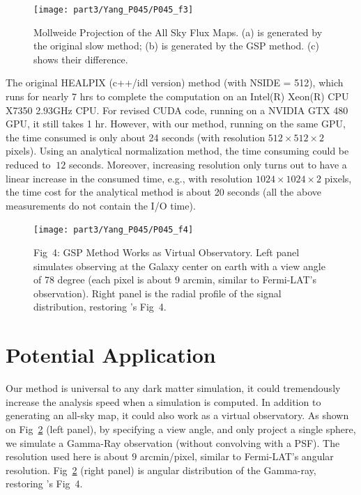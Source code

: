 \begin{figure}[htb]
\begin{center}
 \texttt{[image: part3/Yang\_P045/P045\_f3]}
\caption{Mollweide Projection of the All Sky Flux Maps. (a) is generated by the original slow method; (b) is generated by the GSP method. (c) shows their difference. \label{figcmp}}
\end{center}
\end{figure}

The original HEALPIX (c++/idl version) method (with NSIDE = 512), which runs for nearly 7 hrs to complete the computation on an Intel(R) Xeon(R) CPU X7350 2.93GHz CPU. For revised CUDA code, running on a NVIDIA GTX 480 GPU, it still takes 1 hr. However, with our method, running on the same GPU, the time consumed is only about 24 seconds (with resolution $512\times512\times2$ pixels). Using an analytical normalization method, the time consuming could be reduced to $~12$ seconds. Moreover, increasing resolution only turns out to have a linear increase in the consumed time, e.g., with resolution $1024\times1024\times2$ pixels, the time cost for the analytical method is about 20 seconds (all the above measurements do not contain the I/O time). 

\begin{figure}[htb]
\begin{center}
 \texttt{[image: part3/Yang\_P045/P045\_f4]}
\caption{Fig~4: GSP Method Works as Virtual Observatory. Left panel simulates observing at the Galaxy center on earth with a view angle of 78 degree (each pixel is about 9 arcmin, similar to Fermi-LAT’s observation). Right panel is the radial profile of the signal distribution, restoring \citet{Kuhlen:2008kr}'s Fig~4.  \label{figapp}}
\end{center}
\end{figure}

\section{Potential Application}
Our method is universal to any dark matter simulation, it could tremendously increase the analysis speed when a simulation is computed. In addition to generating an all-sky map, it could also work as a virtual observatory. As shown on Fig~\ref{figapp} (left panel), by specifying a view angle, and only project a single sphere, we simulate a Gamma-Ray observation (without convolving with a PSF). The resolution used here is about $9$ arcmin/pixel, similar to Fermi-LAT's angular resolution. Fig~\ref{figapp} (right panel) is angular distribution of the Gamma-ray, restoring \citet{Kuhlen:2008kr}'s Fig~4. 

